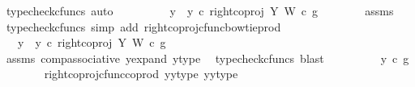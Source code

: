 \begin{isabellebody}
\ {\isacharparenleft}{\kern0pt}typecheck{\isacharunderscore}{\kern0pt}cfuncs{\isacharcomma}{\kern0pt}\ auto{\isacharparenright}{\kern0pt}\isanewline
\ \ \ \ \isamarkupfalse%
\ \isamarkupfalse%
\ {\isachardoublequoteopen}{\isachardot}{\kern0pt}{\isachardot}{\kern0pt}{\isachardot}{\kern0pt}\ {\isacharequal}{\kern0pt}\ {\isacharparenleft}{\kern0pt}y{}\ {\isasymamalg}\ y{}{\isacharparenright}{\kern0pt}\ {\isasymcirc}\isactrlsub c\ right{\isacharunderscore}{\kern0pt}coproj\ Y\ W\ {\isasymcirc}\isactrlsub c\ g{\isachardoublequoteclose}\isanewline
\ \ \ \ \ \ \isamarkupfalse%
\ assms\ \isamarkupfalse%
\ {\isacharparenleft}{\kern0pt}typecheck{\isacharunderscore}{\kern0pt}cfuncs{\isacharcomma}{\kern0pt}\ simp\ add{\isacharcolon}{\kern0pt}\ right{\isacharunderscore}{\kern0pt}coproj{\isacharunderscore}{\kern0pt}cfunc{\isacharunderscore}{\kern0pt}bowtie{\isacharunderscore}{\kern0pt}prod{\isacharparenright}{\kern0pt}\isanewline
\ \ \ \ \isamarkupfalse%
\ \isamarkupfalse%
\ {\isachardoublequoteopen}{\isachardot}{\kern0pt}{\isachardot}{\kern0pt}{\isachardot}{\kern0pt}\ {\isacharequal}{\kern0pt}\ {\isacharparenleft}{\kern0pt}{\isacharparenleft}{\kern0pt}y{}\ {\isasymamalg}\ y{}{\isacharparenright}{\kern0pt}\ {\isasymcirc}\isactrlsub c\ right{\isacharunderscore}{\kern0pt}coproj\ Y\ W{\isacharparenright}{\kern0pt}\ {\isasymcirc}\isactrlsub c\ g{\isachardoublequoteclose}\isanewline
\ \ \ \ \ \ \isamarkupfalse%
\ assms\ comp{\isacharunderscore}{\kern0pt}associative{}\ y{\isacharunderscore}{\kern0pt}expand\ y{\isacharunderscore}{\kern0pt}type\ \isamarkupfalse%
\ {\isacharparenleft}{\kern0pt}typecheck{\isacharunderscore}{\kern0pt}cfuncs{\isacharcomma}{\kern0pt}\ blast{\isacharparenright}{\kern0pt}\isanewline
\ \ \ \ \isamarkupfalse%
\ \isamarkupfalse%
\ {\isachardoublequoteopen}{\isachardot}{\kern0pt}{\isachardot}{\kern0pt}{\isachardot}{\kern0pt}\ {\isacharequal}{\kern0pt}\ y{}\ {\isasymcirc}\isactrlsub c\ g{\isachardoublequoteclose}\isanewline
\ \ \ \ \ \ \isamarkupfalse%
\ right{\isacharunderscore}{\kern0pt}coproj{\isacharunderscore}{\kern0pt}cfunc{\isacharunderscore}{\kern0pt}coprod\ y{}{\isacharunderscore}{\kern0pt}y{}{\isacharunderscore}{\kern0pt}type{\isacharparenleft}{\kern0pt}{}{\isacharparenright}{\kern0pt}\ y{}{\isacharunderscore}{\kern0pt}y{}{\isacharunderscore}{\kern0pt}type{\isacharparenleft}{\kern0pt}{}{\isacharparenright}{\kern0pt}\ \isamarkupfalse%

\end{isabellebody}
